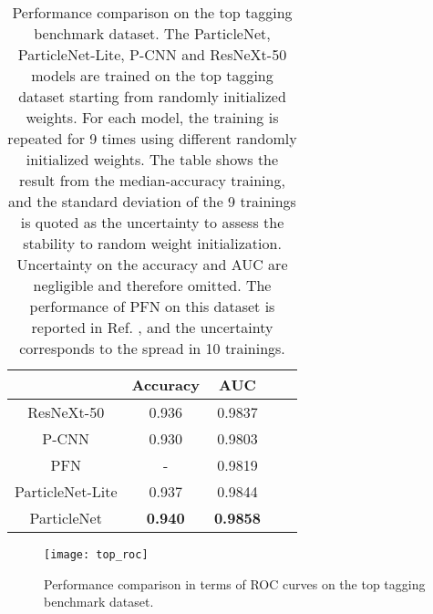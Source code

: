 \documentclass[aps,prd,longbibliography,reprint,amsmath,amssymb,amsfonts]{revtex4-1}
\begin{document}
\begin{table*}[htbp]
\centering
\caption{Performance comparison on the top tagging benchmark dataset. The ParticleNet, ParticleNet-Lite, P-CNN and ResNeXt-50 models are trained on the top tagging dataset starting from randomly initialized weights. For each model, the training is repeated for 9 times using different randomly initialized weights. The table shows the result from the median-accuracy training, and the standard deviation of the 9 trainings is quoted as the uncertainty to assess the stability to random weight initialization. Uncertainty on the accuracy and AUC are negligible and therefore omitted. The performance of PFN on this dataset is reported in Ref. \cite{Komiske:2018cqr}, and the uncertainty corresponds to the spread in 10 trainings.}
\label{tab:results-top}
\begin{ruledtabular}
\begin{tabular}{ccccc}
                       & Accuracy & AUC &  &  \\
    \hline
    ResNeXt-50         & 0.936     & 0.9837            &       &        \\
    P-CNN              & 0.930     & 0.9803            &       &         \\
    PFN                & -         & 0.9819            &       &         \\
    ParticleNet-Lite   & 0.937     & 0.9844            &       &        \\
    ParticleNet        & \bf 0.940 & \bf 0.9858        &   &    \\
\end{tabular}
\end{ruledtabular}
\end{table*}


\begin{figure}[htbp]
    \centering
    \texttt{[image: top\_roc]}
    \caption{Performance comparison in terms of ROC curves on the top tagging benchmark dataset.}
    \label{fig:roc-top}
\end{figure}
\end{document}
